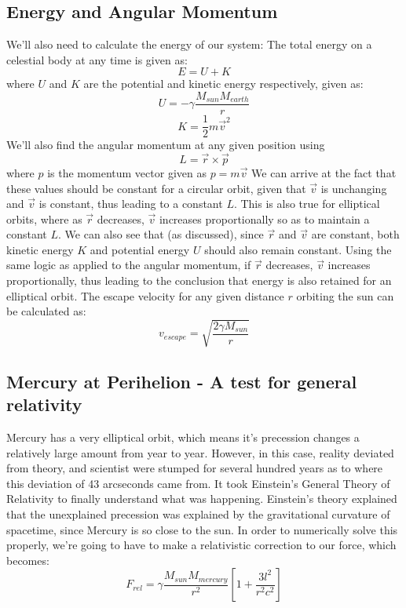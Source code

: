\documentclass{article}
\begin{document}
\subsection{Energy and Angular Momentum}
We'll also need to calculate the energy of our system: \newline The total energy on a celestial body at any time is given as:
\begin{equation}
    E = U + K
\end{equation}
where $U$ and $K$ are the potential and kinetic energy respectively, given as:
\begin{equation*}
    U = -\gamma \frac{M_{sun} M_{earth}}{r}
\end{equation*}
\begin{equation*}
    K = \frac{1}{2} m \Vec{v}^2
\end{equation*}
We'll also find the angular momentum at any given position using
\begin{equation}
    L = \Vec{r} \times \Vec{p}
\end{equation}
where $p$ is the momentum vector given as $p = m \Vec{v}$ \newline
We can arrive at the fact that these values should be constant for a circular orbit, given that $\Vec{v}$ is unchanging and $\Vec{v}$ is constant, thus leading to a constant $L$. This is also true for elliptical orbits, where as $\Vec{r}$ decreases, $\Vec{v}$ increases proportionally so as to maintain a constant $L$. We can also see that (as discussed), since $\Vec{r}$ and $\Vec{v}$ are constant, both kinetic energy $K$ and potential energy $U$ should also remain constant. Using the same logic as applied to the angular momentum, if $\Vec{r}$ decreases, $\Vec{v}$ increases proportionally, thus leading to the conclusion that energy is also retained for an elliptical orbit. \newline 
The escape velocity for any given distance $r$ orbiting the sun can be calculated as:
\begin{equation} \label{1}
    v_{escape} = \sqrt{\frac{2\gamma M_{sun}}{r}}
\end{equation} \newpage
\subsection{Mercury at Perihelion - A test for general relativity}
Mercury has a very elliptical orbit, which means it's precession changes a relatively large amount from year to year. However, in this case, reality deviated from theory, and scientist were stumped for several hundred years as to where this deviation of 43 arcseconds came from. It took Einstein's General Theory of Relativity to finally understand what was happening. \newline
Einstein's theory explained that the unexplained precession was explained by the gravitational curvature of spacetime, since Mercury is so close to the sun. \newline
In order to numerically solve this properly, we're going to have to make a relativistic correction to our force, which becomes:
\begin{equation}\label{2}
    F_{rel} = \gamma \frac{M_{sun}M_{mercury}}{r^2} \left[1 + \frac{3l^2}{r^2c^2} \right]
\end{equation}
\end{document}
